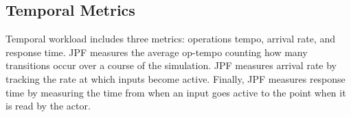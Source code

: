 \subsection{Temporal Metrics}
Temporal workload includes three metrics: operations tempo, arrival rate, and response time.  JPF measures the average op-tempo counting how many transitions occur over a course of the simulation. JPF measures arrival rate by tracking the rate at which inputs become active. Finally, JPF measures response time by measuring the time from when an input goes active to the point when it is read by the actor.
